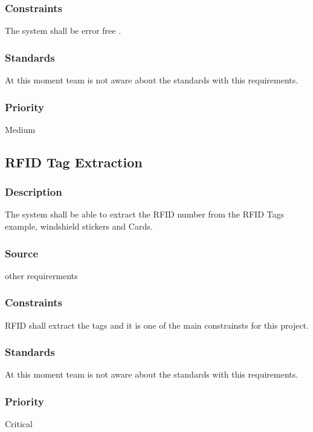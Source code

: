 \subsubsection{Constraints}
\quad \quad The system shall be error free	.
\subsubsection{Standards}
\quad \quad At this moment team is not aware about the standards with this requirements.
\subsubsection{Priority}
\quad \quad Medium

\subsection{RFID Tag Extraction}
\subsubsection{Description}
\quad \quad The system shall be able to extract the RFID number from the RFID Tags example, 
windshield stickers and Cards.
\subsubsection{Source}
\quad \quad other requirerments
\subsubsection{Constraints}
\quad \quad RFID shall extract the tags and it is one of the main constrainsts for this project.
\subsubsection{Standards}
\quad \quad At this moment team is not aware about the standards with this requirements.
\subsubsection{Priority}
\quad \quad Critical